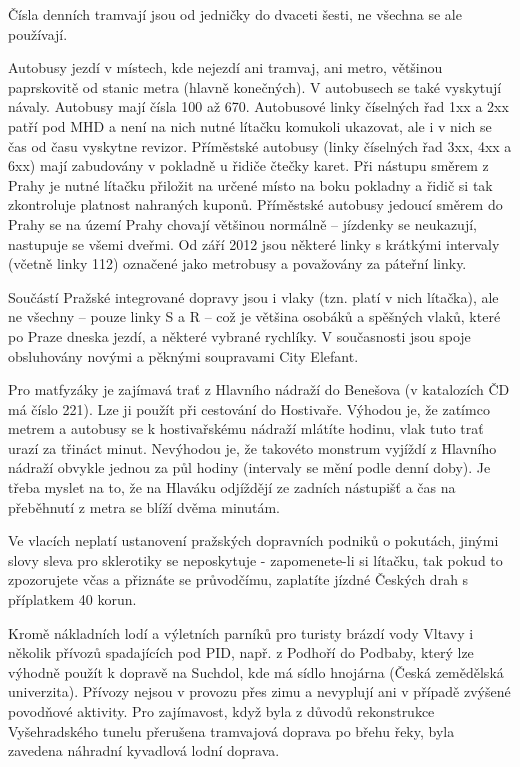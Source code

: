 Čísla denních tramvají jsou od jedničky do dvaceti šesti, ne všechna se ale
používají.


Autobusy jezdí v místech, kde nejezdí ani tramvaj, ani metro, většinou
paprskovitě od stanic metra (hlavně konečných). V autobusech se také vyskytují
návaly. Autobusy mají čísla 100 až 670. Autobusové linky číselných řad 1xx a 2xx
patří pod MHD a není na nich nutné lítačku komukoli ukazovat, ale i v nich se
čas od času vyskytne revizor. Příměstské autobusy (linky číselných řad 3xx, 4xx
a 6xx) mají zabudovány v pokladně u řidiče čtečky karet. Při nástupu směrem z
Prahy je nutné lítačku přiložit na určené místo na boku pokladny a řidič si tak
zkontroluje platnost nahraných kuponů. Příměstské autobusy jedoucí směrem do
Prahy se na území Prahy chovají většinou normálně – jízdenky se neukazují,
nastupuje se všemi dveřmi. Od září 2012 jsou některé linky s krátkými intervaly
(včetně linky 112) označené jako metrobusy a považovány za páteřní linky.


Součástí Pražské integrované dopravy jsou i vlaky (tzn. platí v nich lítačka),
ale ne všechny – pouze linky S a R – což je většina osobáků a spěšných vlaků,
které po Praze dneska jezdí, a některé vybrané rychlíky. V současnosti jsou
spoje obsluhovány novými a pěknými soupravami City Elefant.

Pro matfyzáky je zajímavá trať z Hlavního nádraží do Benešova (v katalozích ČD
má číslo 221). Lze ji použít při cestování do Hostivaře. Výhodou je, že zatímco
metrem a autobusy se k hostivařskému nádraží mlátíte hodinu, vlak tuto trať
urazí za třináct minut. Nevýhodou je, že takovéto monstrum vyjíždí z Hlavního
nádraží obvykle jednou za půl hodiny (intervaly se mění podle denní doby). Je
třeba myslet na to, že na Hlaváku odjíždějí ze zadních nástupišť a čas na
přeběhnutí z metra se blíží dvěma minutám.

Ve vlacích neplatí ustanovení pražských dopravních podniků o pokutách, jinými
slovy sleva pro sklerotiky se neposkytuje - zapomenete-li si lítačku, tak pokud
to zpozorujete včas a přiznáte se průvodčímu, zaplatíte jízdné Českých drah s
příplatkem 40 korun.


Kromě nákladních lodí a výletních parníků pro turisty brázdí vody Vltavy i
několik přívozů spadajících pod PID, např. z Podhoří do Podbaby, který lze
výhodně použít k dopravě na Suchdol, kde má sídlo hnojárna (Česká zemědělská
univerzita). Přívozy nejsou v provozu přes zimu a nevyplují ani v případě
zvýšené povodňové aktivity. Pro zajímavost, když byla z důvodů rekonstrukce
Vyšehradského tunelu přerušena tramvajová doprava po břehu řeky, byla zavedena
náhradní kyvadlová lodní doprava.

